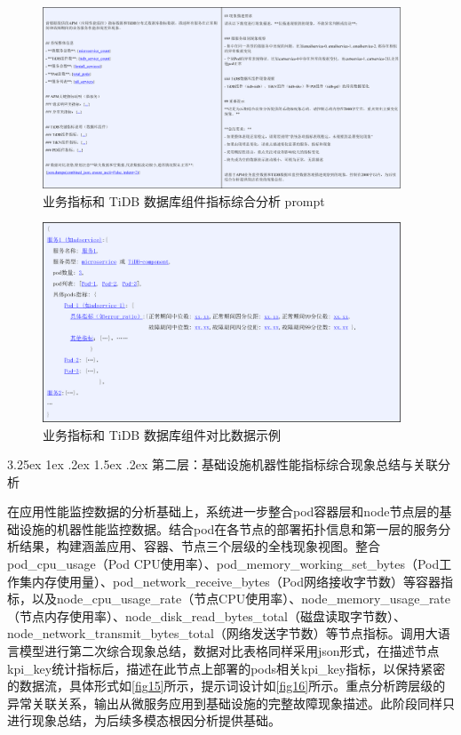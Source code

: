 \documentclass[11pt]{article}
\makeatletter
\renewcommand{\paragraph}{%
    \@startsection{paragraph}{4}{\z@}%
    {3.25ex \@plus1ex \@minus.2ex}%
    {1.5ex \@plus.2ex}%
    {\normalfont\normalsize\bfseries}%
}
\makeatother
\begin{document}
\begin{figure}[htbp]
    \centering
    \includegraphics[width=0.95\textwidth]{pics/fig13.png}
    \caption{业务指标和 TiDB 数据库组件指标综合分析 prompt}
    \label{fig13}
\end{figure}

\begin{figure}[htbp]
    \centering
    \includegraphics[width=0.95\textwidth]{pics/fig14.png}
    \caption{业务指标和 TiDB 数据库组件对比数据示例}
    \label{fig14}
\end{figure}

\paragraph{第二层：基础设施机器性能指标综合现象总结与关联分析}

在应用性能监控数据的分析基础上，系统进一步整合pod容器层和node节点层的基础设施的机器性能监控数据。结合pod在各节点的部署拓扑信息和第一层的服务分析结果，构建涵盖应用、容器、节点三个层级的全栈现象视图。整合pod\_cpu\_usage（Pod CPU使用率）、pod\_memory\_working\_set\_bytes（Pod工作集内存使用量）、pod\_network\_receive\_bytes（Pod网络接收字节数）等容器指标，以及node\_cpu\_usage\_rate（节点CPU使用率）、node\_memory\_usage\_rate（节点内存使用率）、node\_disk\_read\_bytes\_total（磁盘读取字节数）、node\_network\_transmit\_bytes\_total（网络发送字节数）等节点指标。调用大语言模型进行第二次综合现象总结，数据对比表格同样采用json形式，在描述节点kpi\_key统计指标后，描述在此节点上部署的pods相关kpi\_key指标，以保持紧密的数据流，具体形式如\ref{fig15}所示，提示词设计如\ref{fig16}所示。重点分析跨层级的异常关联关系，输出从微服务应用到基础设施的完整故障现象描述。此阶段同样只进行现象总结，为后续多模态根因分析提供基础。
\end{document}
